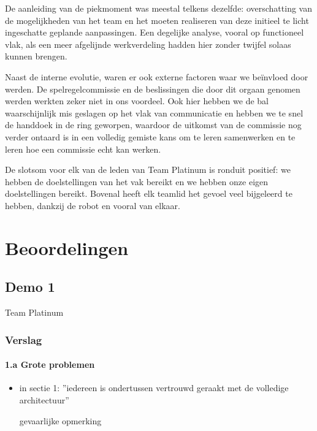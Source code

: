 \documentclass[12pt,a4paper]{report}
\begin{document}
De aanleiding van de piekmoment was meestal telkens dezelfde: overschatting van de mogelijkheden van het team en het moeten realiseren van deze initieel te licht ingeschatte geplande aanpassingen. Een degelijke analyse, vooral op functioneel vlak, als een meer afgelijnde werkverdeling hadden hier zonder twijfel solaas kunnen brengen.

Naast de interne evolutie, waren er ook externe factoren waar we be\"invloed door werden. De spelregelcommissie en de beslissingen die door dit orgaan genomen werden werkten zeker niet in ons voordeel. Ook hier hebben we de bal waarschijnlijk mis geslagen op het vlak van communicatie en hebben we te snel de handdoek in de ring geworpen, waardoor de uitkomst van de commissie nog verder ontaard is in een volledig gemiste kans om te leren samenwerken en te leren hoe een commissie echt kan werken.

De slotsom voor elk van de leden van Team Platinum is ronduit positief: we hebben de doelstellingen van het vak bereikt en we hebben onze eigen doelstellingen bereikt. Bovenal heeft elk teamlid het gevoel veel bijgeleerd te hebben, dankzij de robot en vooral van elkaar.

\appendix

\chapter{Beoordelingen}

\section{Demo 1}
\begin{center}
Team Platinum
\end{center}

\subsection{ Verslag} 
     
     \subsubsection{1.a Grote problemen}

\begin{itemize}
	\item   in sectie 1: 
	''iedereen is ondertussen vertrouwd geraakt met de volledige architectuur''

 gevaarlijke opmerking 
\end{itemize}
\end{document}
